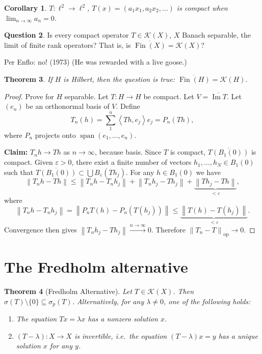 \documentclass[12pt]{article}
\renewcommand{\Im}{\operatorname{Im}}
\DeclareMathOperator{\spn}{span}
\DeclareMathOperator{\Fin}{Fin}
\newcommand{\norm}[1]{\left\| #1 \right\|}
\newcommand{\ip}[2]{\left\langle #1, #2 \right\rangle}
\newcommand{\cK}{\mathcal{K}}
\newtheorem{thm}{Theorem}[section]
\newtheorem{cor}[thm]{Corollary}
\theoremstyle{definition}
\newtheorem{qn}[thm]{Question}
\begin{document}
\begin{cor}
	$T : \ell^2 \to \ell^2$, $T(x) = (a_1x_1, a_2x_2, \dots)$ is compact when $\lim_{n \to \infty} a_n = 0$.
\end{cor}

\begin{qn}
	Is every compact operator $T \in \cK(X)$, $X$ Banach separable, the limit of finite rank operators?
	That is, is $\overline{\Fin(X)} = \cK(X)$?
\end{qn}

\noindent Per Enflo: no! (1973) (He was rewarded with a live goose.)

\begin{thm}
	If $H$ is Hilbert, then the question is true: $\overline{\Fin(H)} = \cK(H)$.
\end{thm}
\begin{proof}
	Prove for $H$ separable.
	Let $T : H \to H$ be compact.
	Let $V = \overline{\Im T}$.
	Let $(e_n)$ be an orthonormal basis of $V$.
	Define
	\begin{equation*}
		T_n(h) = \sum_1^n \ip{Th}{e_j} e_j = P_n(Th),
	\end{equation*}
	where $P_n$ projects onto $\spn(e_1, \dots, e_n)$.

	\textbf{Claim: } $T_n h \to Th$ as $n \to \infty$, because basis.
	Since $T$ is compact, $\overline{T(B_1(0))}$ is compact.
	Given $\varepsilon > 0$, there exist a finite number of vectors $h_1, \dots, h_N \in B_1(0)$ such that $\overline{T(B_1(0))} \subset \bigcup B_\varepsilon(Th_j)$.
	For any $h \in B_1(0)$ we have
	\begin{equation*}
		\norm{T_n h - Th} \leq \norm{T_n h - T_n h_j} + \norm{T_n h_j - Th_j} + \underbrace{\norm{Th_j - Th}}_{< \varepsilon},
	\end{equation*}
	where
	\begin{equation*}
		\norm{T_nh - T_nh_j} = \norm{P_nT(h) - P_n(T(h_j))} \leq \underbrace{\norm{T(h) - T(h_j)}}_{< \varepsilon}.
	\end{equation*}
	Convergence then gives $\norm{T_nh_j - Th_j} \xrightarrow{n \to \infty} 0$.
	Therefore $\norm{T_n - T}_{\mathrm{op}} \to 0$.
\end{proof}

\section{The Fredholm alternative}

\begin{thm}[Fredholm Alternative]
	Let $T \in \cK(X)$.
	Then $\sigma(T) \setminus \lbrace 0 \rbrace \subseteq \sigma_p(T)$.
	Alternatively, for any $\lambda \neq 0$, one of the following holds:
	\begin{enumerate}[nosep]
		\item The equation $Tx = \lambda x$ has a nonzero solution $x$.
		\item $(T-\lambda) : X \to X$ is invertible, i.e.\ the equation $(T-\lambda)x = y$ has a unique solution $x$ for any $y$.
	\end{enumerate}
\end{thm}
\end{document}
